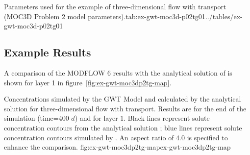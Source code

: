 \begin{StandardTable}{Parameters used for the example of three-dimensional flow with transport (MOC3D Problem 2 model parameters).}{tab:ex-gwt-moc3d-p02tg01}{../tables/ex-gwt-moc3d-p02tg01}
\end{StandardTable}

\subsection{Example Results}

A comparison of the MODFLOW 6 results with the analytical solution of \cite{wexler1992} is shown for layer 1 in figure~\ref{fig:ex-gwt-moc3dp2tg-map}.

\begin{StandardFigure}{
                                     Concentrations simulated by the \mf GWT Model and calculated by the analytical solution for three-dimensional flow with transport.  Results are for the end of the simulation (time=400 $d$) and for layer 1.  Black lines represent solute concentration contours from the analytical solution \citep{wexler1992}; blue lines represent solute concentration contours simulated by \mf.  An aspect ratio of 4.0 is specified to enhance the comparison.
                                     }{fig:ex-gwt-moc3dp2tg-map}{ex-gwt-moc3dp2tg-map}
\end{StandardFigure}            

                

